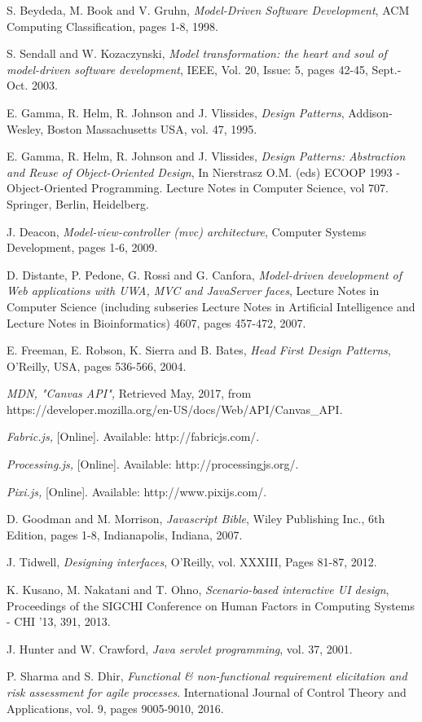 \begin{thebibliography}{1}
	 S. Beydeda, M. Book and V. Gruhn, {\em Model-Driven Software Development}, ACM Computing Classification, pages 1-8, 1998.
	
	 S. Sendall and W. Kozaczynski, {\em Model transformation: the heart and soul of model-driven software development},  IEEE, Vol. 20, Issue: 5, pages 42-45, Sept.-Oct. 2003.
	
	 E. Gamma, R. Helm, R. Johnson and J. Vlissides, {\em Design Patterns},  Addison-Wesley, Boston Massachusetts USA, vol. 47, 1995.
	
	 E. Gamma, R. Helm, R. Johnson and J. Vlissides, {\em Design Patterns: Abstraction and Reuse of Object-Oriented Design}, In Nierstrasz O.M. (eds) ECOOP 1993 - Object-Oriented Programming. Lecture Notes in Computer Science, vol 707. Springer, Berlin, Heidelberg.
	
	 J. Deacon, { \em Model-view-controller (mvc) architecture}, Computer Systems Development, pages 1-6, 2009.
	
	 D. Distante, P. Pedone, G. Rossi and G. Canfora, { \em Model-driven development of Web applications with UWA, MVC and JavaServer faces}, Lecture Notes in Computer Science (including subseries Lecture Notes in Artificial Intelligence and Lecture Notes in Bioinformatics) 4607, pages 457-472, 2007.
	
	 E. Freeman, E. Robson, K. Sierra and B. Bates, { \em Head First Design Patterns}, O'Reilly, USA, pages 536-566, 2004.
	
	 {\em MDN, "Canvas API",} Retrieved May, 2017, from https://developer.mozilla.org/en-US/docs/Web/API/Canvas\_API.
	
	 {\em Fabric.js,} [Online]. Available: http://fabricjs.com/.
	
	 {\em Processing.js,} [Online]. Available: http://processingjs.org/.
	
	 {\em Pixi.js,} [Online]. Available: http://www.pixijs.com/.
	
	 D. Goodman and M. Morrison, {\em Javascript Bible}, Wiley Publishing Inc., 6th Edition, pages 1-8, Indianapolis, Indiana, 2007.
	
	 J. Tidwell, {\em Designing interfaces}, O'Reilly, vol. XXXIII, Pages 81-87, 2012.
	
	 K. Kusano, M. Nakatani and T. Ohno, {\em Scenario-based interactive UI design}, Proceedings of the SIGCHI Conference on Human Factors in Computing Systems - CHI '13, 391,  2013.
	
	 J. Hunter and W. Crawford, {\em Java servlet programming}, vol. 37, 2001.
	
	 P. Sharma and S. Dhir, {\em Functional \& non-functional requirement elicitation and risk assessment for agile processes}. International Journal of Control Theory and Applications, vol. 9, pages 9005-9010, 2016.
	
\end{thebibliography}



